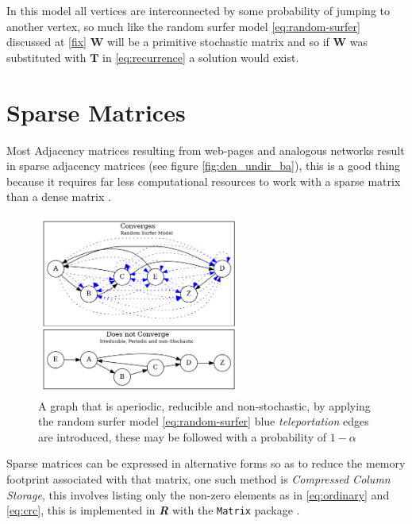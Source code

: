 \documentclass[11pt]{report}
\begin{document}
In this model all vertices are interconnected by some probability of jumping to
another vertex, so much like the random surfer model \eqref{eq:random-surfer} discussed
at \ref{fix} \(\mathbf{W}\) will be a primitive stochastic matrix and so if
\(\mathbf{W}\) was substituted with \(\mathbf{T}\) in \eqref{eq:recurrence} a solution
would exist.

\section{Sparse Matrices}
\label{sparse-matrix}
Most Adjacency matrices resulting from web-pages and analogous networks
result in sparse adjacency matrices (see figure \ref{fig:den_undir_ba}),
this is a good thing because it requires far less computational
resources to work with a sparse matrix than a dense matrix
 \cite[]{langvilleGooglePageRankScience2012} .


 \begin{figure}
 \includegraphics[width=0.6\textwidth]{media/dot/random_surfer.dot.png}
 \caption{\label{fig:rseg}A graph that is aperiodic, reducible and non-stochastic, by applying the random surfer model \eqref{eq:random-surfer} blue \emph{teleportation} edges are introduced, these may be followed with a probability of \(1 - \alpha\)}
 \end{figure}

Sparse matrices can be expressed in alternative forms so as to reduce the memory
footprint associated with that matrix, one such method is \emph{Compressed Column
Storage}, this involves listing only the non-zero elements as in \eqref{eq:ordinary}
and \eqref{eq:crc}, this is implemented in \textbf{\emph{R}} with the \texttt{Matrix} package \cite{douglasbatesMatrixSparseDense2019}.
\end{document}
